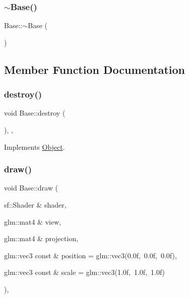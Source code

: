 \subsubsection{\texorpdfstring{$\sim$\+Base()}{~Base()}}
{\footnotesize\ttfamily Base\+::$\sim$\+Base (\begin{DoxyParamCaption}{ }\end{DoxyParamCaption})}



\subsection{Member Function Documentation}
\mbox{\label{classBase_ac547253cd64e7bc7e4a675eaa4e880b7}} 
\subsubsection{\texorpdfstring{destroy()}{destroy()}}
{\footnotesize\ttfamily void Base\+::destroy (\begin{DoxyParamCaption}{ }\end{DoxyParamCaption})\hspace{0.3cm}{\ttfamily [override]}, {\ttfamily [protected]}, {\ttfamily [virtual]}}



Implements \hyperlink{classObject_a69e91bef2c9f048aa4509329dc44948e}{Object}.

\mbox{\label{classBase_ab83ee79d4522f8ad1548d5dd734a3dd5}} 
\subsubsection{\texorpdfstring{draw()}{draw()}}
{\footnotesize\ttfamily void Base\+::draw (\begin{DoxyParamCaption}\item[{sf\+::\+Shader \&}]{shader,  }\item[{glm\+::mat4 \&}]{view,  }\item[{glm\+::mat4 \&}]{projection,  }\item[{glm\+::vec3 const \&}]{position = {\ttfamily glm\+:\+:vec3(0.0f,~0.0f,~0.0f)},  }\item[{glm\+::vec3 const \&}]{scale = {\ttfamily glm\+:\+:vec3(1.0f,~1.0f,~1.0f)} }\end{DoxyParamCaption})\hspace{0.3cm}{\ttfamily [override]}, {\ttfamily [virtual]}}



